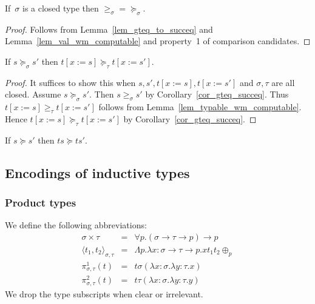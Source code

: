 \documentclass[runningheads,a4paper]{llncs}
\newcommand{\arrtype}{\rightarrow}
\newcommand{\abs}[2]{\lambda #1.#2}
\newcommand{\tabs}[2]{\Lambda #1.#2}
\newcommand{\pair}[2]{\langle #1,#2 \rangle}
\newcommand{\subst}[2]{#1:=#2}
\newcommand{\flatten}{\mathtt{flatten}}
\newcommand{\lift}{\mathtt{lift}}
\begin{document}
\begin{corollary}\label{cor_gteq_succeq}
  If~$\sigma$ is a closed type then ${\geq_{\sigma}} =
  {\succeq_\sigma}$.
\end{corollary}

\begin{proof}
  Follows from Lemma~\ref{lem_gteq_to_succeq} and
  Lemma~\ref{lem_val_wm_computable} and property~1 of comparison
  candidates.
\end{proof}

\begin{lemma}\label{lem_succeq_subst}
  If $s \succeq_\sigma s'$ then $t[\subst{x}{s}] \succeq_\tau t[\subst{x}{s'}]$.
\end{lemma}

\begin{proof}
  It suffices to show this when
  $s,s',t[\subst{x}{s}],t[\subst{x}{s'}]$ and $\sigma,\tau$ are all
  closed. Assume $s \succeq_\sigma s'$. Then $s \geq_{\sigma} s'$
  by Corollary~\ref{cor_gteq_succeq}. Thus $t[\subst{x}{s}]
  \geq_{\tau} t[\subst{x}{s'}]$ follows from
  Lemma~\ref{lem_typable_wm_computable}. Hence $t[\subst{x}{s}]
  \succeq_\tau t[\subst{x}{s'}]$ by Corollary~\ref{cor_gteq_succeq}.
\end{proof}

\begin{corollary}\label{cor_app_wm}
  If $s \succeq s'$ then $t s \succeq t s'$.
\end{corollary}

\subsection{Encodings of inductive types}\label{sec_encodings}

\subsubsection{Product types}

\begin{definition}\normalfont
  We define the following abbreviations:
  \[
  \begin{array}{rcl}
    \sigma \times \tau &=& \forall p . (\sigma \arrtype \tau \arrtype p) \arrtype p \\
    \pair{t_1}{t_2}_{\sigma,\tau} &=& \tabs{p}{\abs{x:\sigma\arrtype\tau\arrtype p}{x t_1 t_2 \oplus_p
    }} \\
    \pi^1_{\sigma,\tau}(t) &=& t \sigma (\abs{x:\sigma}{\abs{y:\tau}{x}}) \\
    \pi^2_{\sigma,\tau}(t) &=& t \tau (\abs{x:\sigma}{\abs{y:\tau}{y}})
  \end{array}
  \]
  We drop the type subscripts when clear or irrelevant.
\end{definition}
\end{document}
